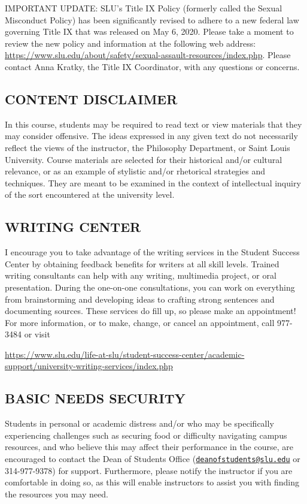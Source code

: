 \documentclass[11pt,]{article}
\begin{document}
IMPORTANT UPDATE: SLU's Title IX Policy (formerly called the Sexual
Misconduct Policy) has been significantly revised to adhere to a new
federal law governing Title IX that was released on May 6, 2020. Please
take a moment to review the new policy and information at the following
web address:
\url{https://www.slu.edu/about/safety/sexual-assault-resources/index.php}.
Please contact Anna Kratky, the Title IX Coordinator, with any questions
or concerns.

\subsection{CONTENT DISCLAIMER}\label{content-disclaimer}

In this course, students may be required to read text or view materials
that they may consider offensive. The ideas expressed in any given text
do not necessarily reflect the views of the instructor, the Philosophy
Department, or Saint Louis University. Course materials are selected for
their historical and/or cultural relevance, or as an example of
stylistic and/or rhetorical strategies and techniques. They are meant to
be examined in the context of intellectual inquiry of the sort
encountered at the university level.

\subsection{WRITING CENTER}\label{writing-center}

I encourage you to take advantage of the writing services in the Student
Success Center by obtaining feedback benefits for writers at all skill
levels. Trained writing consultants can help with any writing,
multimedia project, or oral presentation. During the one-on-one
consultations, you can work on everything from brainstorming and
developing ideas to crafting strong sentences and documenting sources.
These services do fill up, so please make an appointment! For more
information, or to make, change, or cancel an appointment, call 977-3484
or visit

\url{https://www.slu.edu/life-at-slu/student-success-center/academic-support/university-writing-services/index.php}

\subsection{BASIC NEEDS SECURITY}\label{basic-needs-security}

Students in personal or academic distress and/or who may be specifically
experiencing challenges such as securing food or difficulty navigating
campus resources, and who believe this may affect their performance in
the course, are encouraged to contact the Dean of Students Office
(\href{mailto:deanofstudents@slu.edu}{\nolinkurl{deanofstudents@slu.edu}}
or 314-977-9378) for support. Furthermore, please notify the instructor
if you are comfortable in doing so, as this will enable instructors to
assist you with finding the resources you may need.
\end{document}
